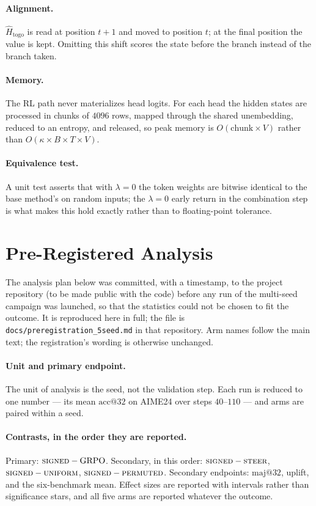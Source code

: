 \documentclass[11pt]{article}
\begin{document}
\paragraph{Alignment.} $\hat{H}_{\mathrm{togo}}$ is read at position $t+1$ and moved
to position $t$; at the final position the value is kept. Omitting this shift scores
the state before the branch instead of the branch taken.

\paragraph{Memory.} The RL path never materializes head logits. For each head the
hidden states are processed in chunks of $4096$ rows, mapped through the shared
unembedding, reduced to an entropy, and released, so peak memory is
$O(\text{chunk} \times V)$ rather than $O(\kappa \times B \times T \times V)$.

\paragraph{Equivalence test.} A unit test asserts that with $\lambda = 0$ the token
weights are bitwise identical to the base method's on random inputs; the
$\lambda = 0$ early return in the combination step is what makes this hold exactly
rather than to floating-point tolerance.

\section{Pre-Registered Analysis}
\label{sec:appendix-prereg}

The analysis plan below was committed, with a timestamp, to the project repository
(to be made public with the code) before any run of
the multi-seed campaign was launched, so that the statistics could not be chosen to
fit the outcome. It is reproduced here in full; the file is
\texttt{docs/preregistration\_5seed.md} in that repository. Arm names follow the main
text; the registration's wording is otherwise unchanged.

\paragraph{Unit and primary endpoint.} The unit of analysis is the seed, not the
validation step. Each run is reduced to one number --- its mean $\mathrm{acc@}32$ on
AIME24 over steps $40$--$110$ --- and arms are paired within a seed.

\paragraph{Contrasts, in the order they are reported.} Primary: $\textsc{signed} -
\text{GRPO}$. Secondary, in this order: $\textsc{signed} - \textsc{steer}$,
$\textsc{signed} - \textsc{uniform}$, $\textsc{signed} - \textsc{permuted}$. Secondary
endpoints: $\mathrm{maj@}32$, uplift, and the six-benchmark mean. Effect sizes are
reported with intervals rather than significance stars, and all five arms are
reported whatever the outcome.
\end{document}
